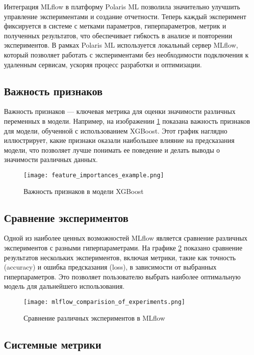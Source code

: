Интеграция MLflow в платформу Polaris ML позволила значительно улучшить управление экспериментами и создание отчетности. Теперь каждый эксперимент фиксируется в системе с метками параметров, гиперпараметров, метрик и полученных результатов, что обеспечивает гибкость в анализе и повторении экспериментов. В рамках Polaris ML используется локальный сервер MLflow, который позволяет работать с экспериментами без необходимости подключения к удаленным сервисам, ускоряя процесс разработки и оптимизации.

\subsection{Важность признаков}

Важность признаков — ключевая метрика для оценки значимости различных переменных в модели. Например, на изображении \ref{fig:feature_importances} показана важность признаков для модели, обученной с использованием XGBoost. Этот график наглядно иллюстрирует, какие признаки оказали наибольшее влияние на предсказания модели, что позволяет лучше понимать ее поведение и делать выводы о значимости различных данных.

\begin{figure}[h!]
	\centering
	\texttt{[image: feature\_importances\_example.png]}
	\caption{Важность признаков в модели XGBoost}
	\label{fig:feature_importances}
\end{figure}

\subsection{Сравнение экспериментов}

Одной из наиболее ценных возможностей MLflow является сравнение различных экспериментов с разными гиперпараметрами. На графике \ref{fig:mlflow_comparison} показано сравнение результатов нескольких экспериментов, включая метрики, такие как точность (accuracy) и ошибка предсказания (loss), в зависимости от выбранных гиперпараметров. Это позволяет пользователю выбрать наиболее оптимальную модель для дальнейшего использования.

\begin{figure}[h!]
	\centering
	\texttt{[image: mlflow\_comparision\_of\_experiments.png]}
	\caption{Сравнение различных экспериментов в MLflow}
	\label{fig:mlflow_comparison}
\end{figure}

\subsection{Системные метрики}

